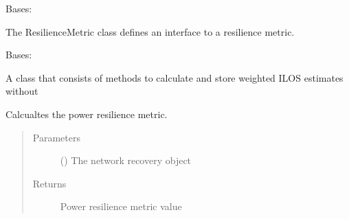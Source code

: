\documentclass[letterpaper,10pt,english]{sphinxmanual}
\begin{document}
\begin{fulllineitems}
\label{\detokenize{apidoc:dreaminsg_integrated_model.src.resilience_metrics.ResilienceMetric}}
\sphinxAtStartPar
Bases: 

\sphinxAtStartPar
The ResilienceMetric class defines an interface to a resilience metric.

\end{fulllineitems}


\begin{fulllineitems}
\label{\detokenize{apidoc:dreaminsg_integrated_model.src.resilience_metrics.WeightedResilienceMetric}}
\sphinxAtStartPar
Bases: {\hyperref[\detokenize{apidoc:dreaminsg_integrated_model.src.resilience_metrics.ResilienceMetric}]{}}

\sphinxAtStartPar
A class that consists of methods to calculate and store weighted ILOS estimates without

\begin{fulllineitems}
\label{\detokenize{apidoc:dreaminsg_integrated_model.src.resilience_metrics.WeightedResilienceMetric.calculate_power_resmetric}}
\sphinxAtStartPar
Calcualtes the power resilience metric.
\begin{quote}\begin{description}
\item[{Parameters}] \leavevmode
\sphinxAtStartPar
{} () \textendash{} The network recovery object

\item[{Returns}] \leavevmode
\sphinxAtStartPar
Power resilience metric value


\end{description}
\end{quote}
\end{fulllineitems}
\end{fulllineitems}
\end{document}
